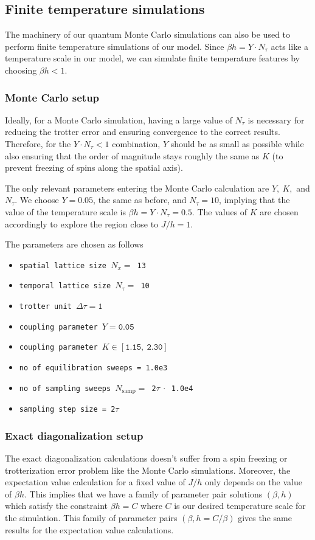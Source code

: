 \documentclass[../thesis_main.tex]{subfiles}
\begin{document}
\subsection{Finite temperature simulations}
The machinery of our quantum Monte Carlo simulations can also be used to perform finite temperature simulations of our model. Since $\beta h = Y \cdot N_\tau$ acts like a temperature scale in our model, we can simulate finite temperature features by choosing $\beta h < 1$. 

\subsubsection{Monte Carlo setup}
Ideally, for a Monte Carlo simulation, having a large value of $N_\tau$ is necessary for reducing the trotter error and ensuring convergence to the correct results. Therefore, for the $ Y \cdot N_\tau < 1$ combination, $Y$ should be as small as possible while also ensuring that the order of magnitude stays roughly the same as $K$ (to prevent freezing of spins along the spatial axis). 

The only relevant parameters entering the Monte Carlo calculation are $Y, \:K, $ and $N_\tau$. We choose $Y = 0.05$, the same as before, and $N_\tau = 10$, implying that the value of the temperature scale is $\beta h = Y \cdot N_\tau = 0.5$. The values of $K$ are chosen accordingly to explore the region close to $J/h = 1$. 

The parameters are chosen as follows
\begin{itemize}[label={}]
    \setlength{\itemsep}{0.1em}
    \item \texttt{spatial lattice size $N_x = $ 13}
    \item \texttt{temporal lattice size $N_\tau = $ 10}
    \item \texttt{trotter unit $\Delta \tau = \texttt{1} $}
    \item \texttt{coupling parameter $Y = \texttt{0.05}$}
    \item \texttt{coupling parameter $K \in [\texttt{1.15}, \: \texttt{2.30}]$}
    \item \texttt{no of equilibration sweeps = \texttt{1.0e3}}
    \item \texttt{no of sampling sweeps $N_\text{samp} = $ 2$\tau \: \cdot$ 1.0e4}
    \item \texttt{sampling step size = 2$\tau $ }
\end{itemize}

\subsubsection{Exact diagonalization setup}
The exact diagonalization calculations doesn't suffer from a spin freezing or trotterization error problem like the Monte Carlo simulations. Moreover, the expectation value calculation for a fixed value of $J/h$ only depends on the value of $\beta h$. This implies that we have a family of parameter pair solutions $(\beta, h)$ which satisfy the constraint $\beta h = C$ where $C$ is our desired temperature scale for the simulation. This family of parameter pairs $(\beta, h = C/\beta)$ gives the same results for the expectation value calculations. 
\end{document}

